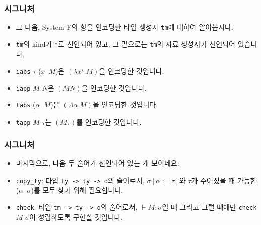 \documentclass[slidestop,compress,mathserif]{beamer}
\begin{document}
    \begin{frame}
        \frametitle{시그니처}
        \begin{itemize}
            \item 그 다음, System-F의 항을 인코딩한 타입 생성자 \texttt{tm}에 대하여 알아봅시다.
            \item \texttt{tm}의 kind가 \texttt{*}로 선언되어 있고, 그 밑으로는 \texttt{tm}의 자료 생성자가 선언되어 있습니다.
            \item \texttt{iabs} $\tau$ ($x$\texttt{\string\ }$M$)은 $\left( \lambda x^{\tau} . M \right)$을 인코딩한 것입니다.
            \item \texttt{iapp} $M$ $N$은 $\left( M N \right)$을 인코딩한 것입니다.
            \item \texttt{tabs} ($\alpha$\texttt{\string\ }$M$)은 $\left( \Lambda \alpha . M \right)$을 인코딩한 것입니다.
            \item \texttt{tapp} $M$ $\tau$는 $\left( M \tau \right)$를 인코딩한 것입니다.
        \end{itemize}
    \end{frame}

    \begin{frame}
        \frametitle{시그니처}
        \begin{itemize}
            \item 마지막으로, 다음 두 술어가 선언되어 있는 게 보이네요:
            \item \texttt{copy\_ty}: 타입 \texttt{ty -> ty -> o}의 술어로서, $\sigma \left[ \alpha := \tau \right]$와 $\tau$가 주어졌을 때 가능한 ($\alpha$\texttt{\string\ }$\sigma$)를 모두 찾기 위해 필요합니다.
            \item \texttt{check}: 타입 \texttt{tm -> ty -> o}의 술어로서, $\vdash M : \sigma$일 때 그리고 그럴 때에만 \texttt{check} $M$ $\sigma$이 성립하도록 구현할 것입니다.
        \end{itemize}
    \end{frame}
\end{document}
